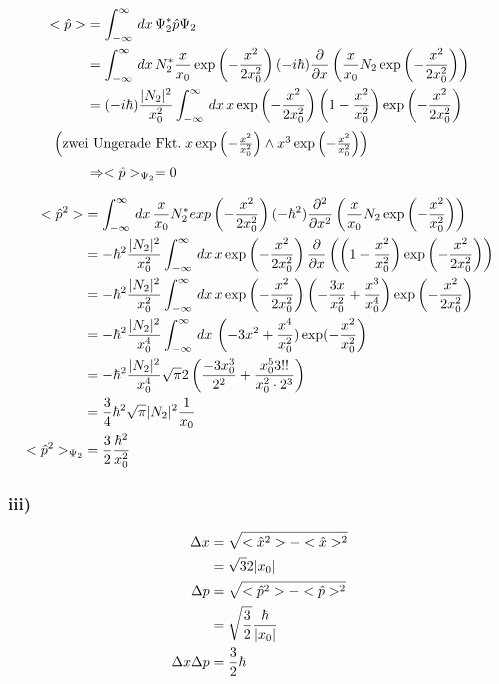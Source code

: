 \begin{align}
    <\hat p > &= \int_{-\infty}^{\infty}\,dx\, \Psi _2^*\hat p \Psi _2\\
    &=\int_{-\infty}^{\infty}\,dx\, N_2^* \frac{x}{x_0} \exp\left(-\frac{x^2}{2x_0^2}\right) (-i\hbar) \frac{\partial}{\partial x}\left(\frac{x}{x_0} N_2 \exp \left(-\frac{x^2}{2x_0^2}\right)\right) \\
    &=(-i\hbar) \frac{\lvert N_2\rvert^2}{x_0^2} \int_{-\infty}^{\infty} \,dx\,x\exp\left(-\frac{x^2}{2x_0^2}\right) \left(1-\frac{x^2}{x_0^2}\right)\exp\left(-\frac{x^2}{2x_0^2}\right)\\
    \intertext{
        $\left(\text{zwei Ungerade Fkt.}\; x \exp\left(-\frac{x^2}{x_0^2} \right) \wedge x^3 \exp\left(-\frac{x^2}{x_0^2} \right) \right)$
    }
    &\Rightarrow <\hat p >_{\Psi _2}=0
\end{align}

\begin{align}
    <\hat p ^2> &= \int_{-\infty}^{\infty}\,dx\, \frac{x}{x_0} N_2^* exp\left(-\frac{x^2}{2x_0^2}\right) (-\hbar^2) \frac{\partial ^2}{\partial x^2}\left(\frac{x}{x_0} N_2 \exp\left(-\frac{x^2}{x_0^2}\right) \right)\\
    &= - \hbar ^2 \frac{\lvert N_2\rvert^2}{x_0^2} \int_{-\infty}^{\infty}\,dx\, x \exp\left(-\frac{x^2}{2x_0^2}\right)\frac{\partial}{\partial x}\left(\left(1-\frac{x^2}{x_0^2}\right)\exp\left(-\frac{x^2}{2x_0^2}\right) \right)\\
    &= - \hbar ^2 \frac{\lvert N_2\rvert^2}{x_0^2} \int_{-\infty}^{\infty}\,dx\, x \exp\left(-\frac{x^2}{2x_0^2}\right)\left(\--\frac{3x}{x_0^2}+\frac{x^3}{x_0^4} \right) \exp\left(-\frac{x^2}{2x_0^2}\right)\\
    &= - \hbar^2 \frac{\lvert N_2\rvert^2}{x_0^4} \int_{-\infty}^{\infty}\,dx\, \left(-3x^2+\frac{x^4}{x_0^2})\exp(-\frac{x^2}{x_0^2}\right)\\
    &= - \hbar^2 \frac{\lvert N_2\rvert^2}{x_0^4} \sqrt{\pi} 2\left(\frac{-3x_0^3}{2^2}+\frac{x_0^5 3!!}{x_0^2\cdot 2^3}\right)\\
    &= \frac{3}{4} \hbar^2 \sqrt{\pi} \lvert N_2\rvert^2 \frac{1}{x_0}\\
    <\hat p ^2 >_{\Psi _2}&=\frac{3}{2} \frac{\hbar ^2}{x_0^2}
\end{align}

\subsubsection{iii)}
\begin{align}
\Delta x&= \sqrt{<\hat x ^2>-<\hat x>^2 }\\
&=\sqrt{3}{2} \lvert x_0\rvert\\
\Delta p &= \sqrt{<\hat p ^2>-<\hat p >^2}\\
&=\sqrt{\frac{3}{2}}\frac{\hbar}{\lvert x_0\rvert}\\
\Delta x \Delta p &= \frac{3}{2} \hbar 
\end{align}

